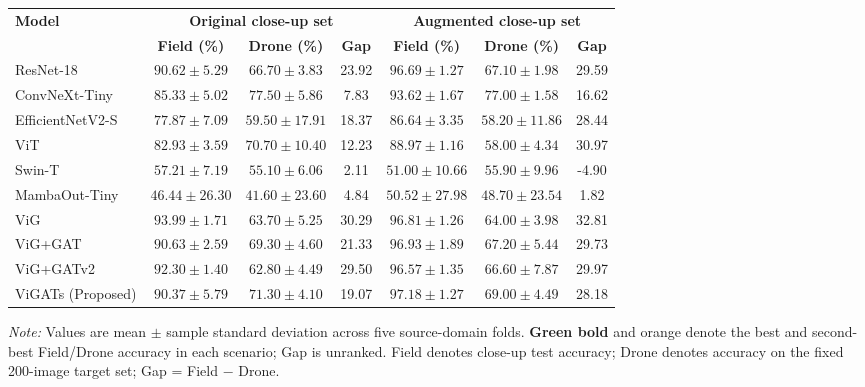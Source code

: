 \documentclass[]{interact}
\theoremstyle{plain}
\theoremstyle{definition}
\theoremstyle{remark}
\newcommand{\bestresult}[1]{\textcolor{bestgreen}{\textbf{#1}}}
\newcommand{\secondresult}[1]{\textcolor{secondorange}{#1}}
\begin{document}
\begin{table}[H]
\footnotesize
\setlength{\tabcolsep}{3.2pt}
{\begin{tabular}{lcccccc} \toprule
\multirow{2}{*}{\textbf{Model}} & \multicolumn{3}{c}{\textbf{Original close-up set}} & \multicolumn{3}{c}{\textbf{Augmented close-up set}} \\ \cmidrule(lr){2-4} \cmidrule(lr){5-7}
 & \textbf{Field (\%)} & \textbf{Drone (\%)} & \textbf{Gap} & \textbf{Field (\%)} & \textbf{Drone (\%)} & \textbf{Gap} \\ \midrule
ResNet-18 \citep{he2016deep} & $90.62 \pm 5.29$ & $66.70 \pm 3.83$ & 23.92 & $96.69 \pm 1.27$ & $67.10 \pm 1.98$ & 29.59 \\
ConvNeXt-Tiny \citep{liu2022convnext} & $85.33 \pm 5.02$ & \bestresult{$77.50 \pm 5.86$} & 7.83 & $93.62 \pm 1.67$ & \bestresult{$77.00 \pm 1.58$} & 16.62 \\
EfficientNetV2-S \citep{tan2021efficientnetv2} & $77.87 \pm 7.09$ & $59.50 \pm 17.91$ & 18.37 & $86.64 \pm 3.35$ & $58.20 \pm 11.86$ & 28.44 \\
ViT \citep{dosovitskiy2020image} & $82.93 \pm 3.59$ & $70.70 \pm 10.40$ & 12.23 & $88.97 \pm 1.16$ & $58.00 \pm 4.34$ & 30.97 \\
Swin-T \citep{liu2021swin} & $57.21 \pm 7.19$ & $55.10 \pm 6.06$ & 2.11 & $51.00 \pm 10.66$ & $55.90 \pm 9.96$ & -4.90 \\
MambaOut-Tiny \citep{yu2024mambaout} & $46.44 \pm 26.30$ & $41.60 \pm 23.60$ & 4.84 & $50.52 \pm 27.98$ & $48.70 \pm 23.54$ & 1.82 \\
ViG \citep{han2022vision} & \bestresult{$93.99 \pm 1.71$} & $63.70 \pm 5.25$ & 30.29 & $96.81 \pm 1.26$ & $64.00 \pm 3.98$ & 32.81 \\
ViG+GAT \citep{velickovic2018graph} & $90.63 \pm 2.59$ & $69.30 \pm 4.60$ & 21.33 & \secondresult{$96.93 \pm 1.89$} & $67.20 \pm 5.44$ & 29.73 \\
ViG+GATv2 \citep{brody2022gat} & \secondresult{$92.30 \pm 1.40$} & $62.80 \pm 4.49$ & 29.50 & $96.57 \pm 1.35$ & $66.60 \pm 7.87$ & 29.97 \\
ViGATs (Proposed) & $90.37 \pm 5.79$ & \secondresult{$71.30 \pm 4.10$} & 19.07 & \bestresult{$97.18 \pm 1.27$} & \secondresult{$69.00 \pm 4.49$} & 28.18 \\
\bottomrule
\end{tabular}}
\label{tab:crossdomain}
\parbox{\textwidth}{\vspace{2pt}\footnotesize\textit{Note:} Values are mean $\pm$ sample standard deviation across five source-domain folds. \bestresult{Green bold} and \secondresult{orange} denote the best and second-best Field/Drone accuracy in each scenario; Gap is unranked. Field denotes close-up test accuracy; Drone denotes accuracy on the fixed 200-image target set; Gap = Field $-$ Drone.}
\end{table}
\end{document}
